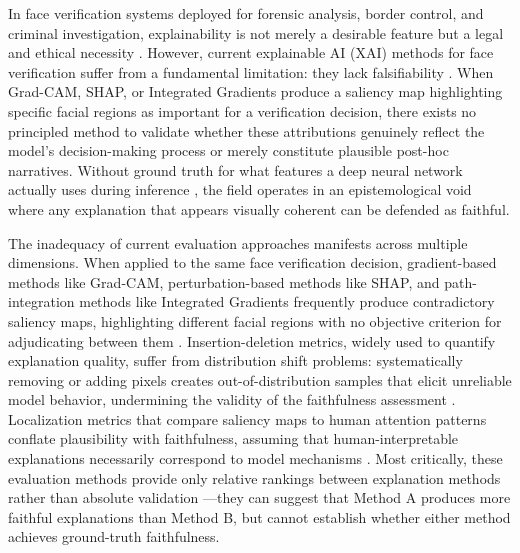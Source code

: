 In face verification systems deployed for forensic analysis, border control, and criminal investigation, explainability is not merely a desirable feature but a legal and ethical necessity \cite{wachter2017right,selbst2018intuitive}. However, current explainable AI (XAI) methods for face verification suffer from a fundamental limitation: they lack falsifiability \cite{popper1959logic}. When Grad-CAM, SHAP, or Integrated Gradients produce a saliency map highlighting specific facial regions as important for a verification decision, there exists no principled method to validate \cite{krishna2022disagreement,zhou2022evaluating} whether these attributions genuinely reflect the model's decision-making process or merely constitute plausible post-hoc narratives. Without ground truth for what features a deep neural network actually uses during inference \cite{doshivelez2017rigorous}, the field operates in an epistemological void where any explanation that appears visually coherent can be defended as faithful.

The inadequacy of current evaluation approaches manifests across multiple dimensions. When applied to the same face verification decision, gradient-based methods like Grad-CAM, perturbation-based methods like SHAP, and path-integration methods like Integrated Gradients frequently produce contradictory saliency maps, highlighting different facial regions with no objective criterion for adjudicating between them \cite{Adebayo2018_SanityChecks,Tomsett2020_SanityChecks,krishna2022disagreement}. Insertion-deletion metrics, widely used to quantify explanation quality, suffer from distribution shift problems: systematically removing or adding pixels creates out-of-distribution samples that elicit unreliable model behavior, undermining the validity of the faithfulness assessment \cite{hooker2019benchmark,rong2022consistent}. Localization metrics that compare saliency maps to human attention patterns conflate plausibility with faithfulness, assuming that human-interpretable explanations necessarily correspond to model mechanisms \cite{Zhou2022_AttributionCorrectness,jacovi2020faithfully}. Most critically, these evaluation methods provide only relative rankings between explanation methods rather than absolute validation \cite{Nauta2023_QuantitativeEvaluation,hedstrom2023quantus}---they can suggest that Method A produces more faithful explanations than Method B, but cannot establish whether either method achieves ground-truth faithfulness.

